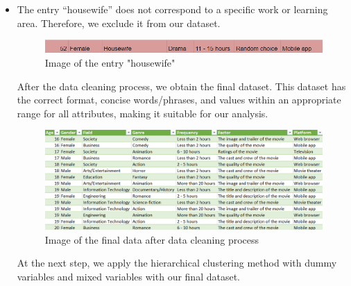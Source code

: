 \begin{itemize}
                    \item The entry “housewife” does not correspond to a specific work or learning area. Therefore, we exclude it from our dataset.
                        \begin{figure}[H]
                            \centering
                            \includegraphics[scale=0.75]{graphics/data/housewife.png}
                            \caption{Image of the entry "housewife"}
                        \end{figure} 
                    After the data cleaning process, we obtain the final dataset. This dataset has the correct format, concise words/phrases, and values within an appropriate range for all attributes, making it suitable for our analysis.
                    \begin{figure}[H]
                        \centering
                        \includegraphics[scale=0.65]{graphics/data/finaldata.png}
                        \caption{Image of the final data after data cleaning process}
                    \end{figure} 
            At the next step, we apply the hierarchical clustering method with dummy variables and mixed variables with our final dataset.
                \end{itemize}  
            


